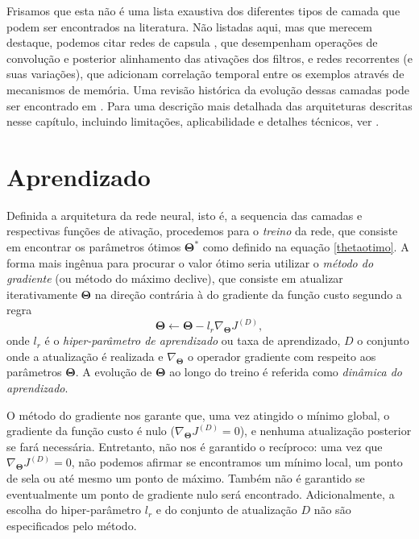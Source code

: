 Frisamos que esta não é uma lista exaustiva dos diferentes tipos de camada que podem ser encontrados na literatura. Não listadas aqui, mas que merecem destaque, podemos citar redes de capsula \cite{sabour2017dynamic}, que desempenham operações de convolução e posterior alinhamento das ativações dos filtros, e redes recorrentes (e suas variações), que adicionam correlação temporal entre os exemplos através de mecanismos de memória. Uma revisão histórica da evolução dessas camadas pode ser encontrado em \cite{jurgenReview2015}. Para uma descrição mais detalhada das arquiteturas descritas nesse capítulo, incluindo limitações, aplicabilidade e detalhes técnicos, ver \cite{Goodfellow-et-al-2016}.

\section{Aprendizado}\label{sec:aprendizado}

Definida a arquitetura da rede neural, isto é, a sequencia das camadas e respectivas funções de ativação, procedemos para o \textit{treino} da rede, que consiste em encontrar os parâmetros ótimos $\mathbf{\Theta}^*$ como definido na equação \ref{thetaotimo}. A forma mais ingênua para procurar o valor ótimo seria utilizar o \textit{método do gradiente} (ou método do máximo declive), que consiste em atualizar iterativamente $\mathbf{\Theta}$ na direção contrária à do gradiente da função custo segundo a regra 
\begin{equation}
\mathbf{\Theta} \leftarrow \mathbf{\Theta} - l_r \nabla_{\mathbf{\Theta}} J^{(D)},
\end{equation}
onde $l_r$ é o \textit{hiper-parâmetro de aprendizado} ou taxa de aprendizado, $D$ o conjunto onde a atualização é realizada e $\nabla_{\mathbf{\Theta}}$ o operador gradiente com respeito aos parâmetros $\mathbf{\Theta}$. A evolução de $\mathbf{\Theta}$ ao longo do treino é referida como \textit{dinâmica do aprendizado}.

O método do gradiente nos garante que, uma vez atingido o mínimo global, o gradiente da função custo é nulo ($\nabla_{\mathbf{\Theta}} J^{(D)} = 0$), e nenhuma atualização posterior se fará necessária. Entretanto, não nos é garantido o recíproco: uma vez que $\nabla_{\mathbf{\Theta}} J^{(D)} = 0$, não podemos afirmar se encontramos um mínimo local, um ponto de sela ou até mesmo um ponto de máximo. Também não é garantido se eventualmente um ponto de gradiente nulo será encontrado. Adicionalmente, a escolha do hiper-parâmetro $l_r$ e do conjunto de atualização $D$ não são especificados pelo método.

